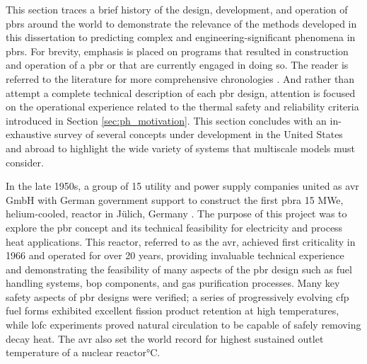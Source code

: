 This section traces a brief history of the design, development, and operation of \glspl{pbr} around the world to demonstrate the relevance of the methods developed in this dissertation to predicting complex and engineering-significant phenomena in \glspl{pbr}. For brevity, emphasis is placed on programs that resulted in construction and operation of a \gls{pbr} or that are currently engaged in doing so. The reader is referred to the literature for more comprehensive chronologies \cite{claxton,thomas}. And rather than attempt a complete technical description of each \gls{pbr} design, attention is focused on the operational experience related to the thermal safety and reliability criteria introduced in Section \ref{sec:ph_motivation}. This section concludes with an in-exhaustive survey of several concepts under development in the United States and abroad to highlight the wide variety of systems that multiscale models must consider.

In the late 1950s, a group of 15 utility and power supply companies united as \gls{avr} GmbH with German government support to construct the first \gls{pbr}\mdash a 15 MWe, helium-cooled, reactor in J{\"u}lich, Germany \cite{hecker,oehme,nrc_avr,moormann}. The purpose of this project was to explore the \gls{pbr} concept and its technical feasibility for electricity and process heat applications. This reactor, referred to as the \gls{avr}, achieved first criticality in 1966 and operated for over 20 years, providing invaluable technical experience and demonstrating the feasibility of many aspects of the {pbr} design such as fuel handling systems, \gls{bop} components, and gas purification processes. Many key safety aspects of \gls{pbr} designs were verified; a series of progressively evolving \gls{cfp} fuel forms exhibited excellent fission product retention at high temperatures, while \gls{lofc} experiments proved natural circulation to be capable of safely removing decay heat. The \gls{avr} also set the world record for highest sustained outlet temperature of a nuclear reactor\si{\celsius}.

